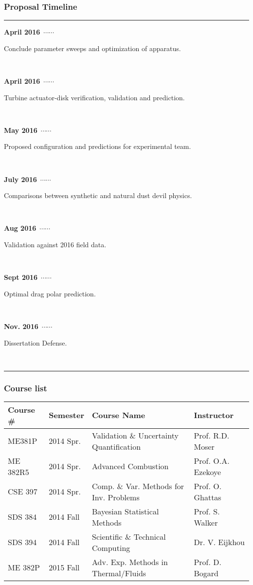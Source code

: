 \documentclass[mathserif]{beamer}
\newcommand\ytl[2]{
\parbox[b]{8em}{\hfill{\color{black}\bfseries\sffamily
#1}~$\cdots\cdots$~}\makebox[0pt][c]{$\bullet$}\vrule\quad
\parbox[c]{8.5cm}{\vspace{7pt}\color{black}\raggedright\sffamily
#2.\\[7pt]}\\[-3pt]}
\newcommand\yto[2]{
\parbox[b]{8em}{\hfill{\color{orange}\bfseries\sffamily
#1}~$\cdots\cdots$~}\makebox[0pt][c]{$\bullet$}\vrule\quad
\parbox[c]{8.5cm}{\vspace{7pt}\color{orange}\raggedright\sffamily
#2.\\[7pt]}\\[-3pt]}
\newcommand\ytb[2]{
\parbox[b]{8em}{\hfill{\color{blue}\bfseries\sffamily
#1}~$\cdots\cdots$~}\makebox[0pt][c]{$\bullet$}\vrule\quad
\parbox[c]{8.5cm}{\vspace{7pt}\color{blue}\raggedright\sffamily
#2.\\[7pt]}\\[-3pt]}
\begin{document}
%
%
%
\begin{frame}
\frametitle{Proposal Timeline}
\small
\begin{center}
\begin{table}
\centering
\begin{minipage}[t]{1.6\linewidth}
\color{black}
 \rule{\linewidth}{1pt}
 \yto{April 2016}{Conclude parameter sweeps and optimization of apparatus}
 \yto{April 2016}{Turbine actuator-disk verification, validation and prediction}
 \ytl{May 2016}{Proposed configuration and predictions for experimental
 team}
 \ytb{July 2016}{Comparisons between synthetic and natural dust devil physics}
 \ytl{Aug 2016}{Validation against 2016 field data}
 \ytl{Sept 2016}{Optimal drag polar prediction}
\ytl{Nov. 2016}{Dissertation Defense}
 \bigskip
 \rule{\linewidth}{1pt}%
\end{minipage}%
\end{table}
 \label{tab:prop}
\end{center}

\end{frame}


%
%
%
\begin{frame}
 \frametitle{Course list}
 \footnotesize
 \begin{table}[h]
  \centering
  \begin{tabular}{llll}
   \hline \hline
   Course \# & Semester & Course Name & Instructor \\ 
   \hline 
   ME381P   & 2014 Spr.   & Validation \& Uncertainty Quantification &
	       Prof. R.D. Moser \\
   ME 382R5 & 2014 Spr.   & Advanced Combustion & Prof. O.A. Ezekoye \\
   CSE 397  & 2014 Spr.   &  Comp. \& Var. Methods for
	   Inv. Problems & Prof. O. Ghattas \\
   SDS 384  & 2014 Fall   & Bayesian Statistical Methods & Prof. S.
	       Walker \\
   SDS 394  & 2014 Fall   & Scientific \& Technical Computing & Dr. V. Eijkhou \\
   ME 382P  & 2015 Fall   & Adv. Exp. Methods in Thermal/Fluids
	   & Prof. D. Bogard \\  
   \hline \hline
  \end{tabular} 
 \end{table}

\end{frame}
\end{document}
